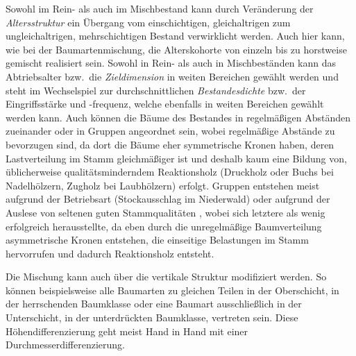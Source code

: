 \documentclass[twocolumn, paper=a4, fontsize=10pt, bibliography=totoc, index=totoc]{scrartcl}
\begin{document}
Sowohl im Rein- als auch im Mischbestand kann durch Veränderung der
\emph{Altersstruktur} ein Übergang vom einschichtigen, gleichaltrigen zum
ungleichaltrigen, mehrschichtigen Bestand verwirklicht werden. Auch hier kann,
wie bei der Baumartenmischung, die Alterskohorte von einzeln bis zu horstweise
gemischt realisiert sein. Sowohl in Rein- als auch in Mischbeständen kann das
Abtriebsalter bzw.\ die \emph{Zieldimension} in weiten Bereichen gewählt werden
und steht im Wechselspiel zur durchschnittlichen \emph{Bestandesdichte} bzw.\
der Eingriffsstärke und -frequenz, welche ebenfalls in weiten Bereichen gewählt
werden kann. Auch können die Bäume des Bestandes in regelmäßigen Abständen
zueinander oder in Gruppen angeordnet sein, wobei regelmäßige Abstände zu
bevorzugen sind, da dort die Bäume eher symmetrische Kronen haben, deren
Lastverteilung im Stamm gleichmäßiger ist und deshalb kaum eine Bildung von,
üblicherweise qualitätsminderndem Reaktionsholz\index{Reaktionsholz} (Druckholz oder Buchs bei
Nadelhölzern, Zugholz\index{Reaktionsholz!Zugholz} bei Laubhölzern) erfolgt. Gruppen entstehen meist aufgrund
der Betriebsart (Stockausschlag im Niederwald) oder aufgrund der Auslese von
seltenen guten Stammqualitäten
\citep{kato1969Buchendurchforstung,kato1988Gruppendurchforstung}, wobei sich
letztere als wenig erfolgreich herausstellte, da eben durch die unregelmäßige
Baumverteilung asymmetrische Kronen entstehen, die einseitige Belastungen im
Stamm hervorrufen und dadurch Reaktionsholz entsteht.

Die Mischung kann auch über die vertikale Struktur modifiziert
werden. So können beispielsweise alle Baumarten zu gleichen Teilen in
der Oberschicht, in der herrschenden Baumklasse oder eine Baumart
ausschließlich in der Unterschicht, in der unterdrückten Baumklasse,
vertreten sein. Diese Höhendifferenzierung geht meist Hand in Hand mit
einer Durchmesserdifferenzierung.
\end{document}
